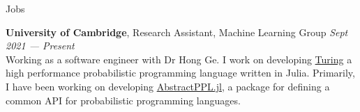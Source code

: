 \begin{rSection}{Jobs}

    {\bf University of Cambridge}, Research Assistant, Machine Learning Group  \hfill {\em Sept 2021 — Present} \\
    Working as a software engineer with Dr Hong Ge. I work on developing \href{https://github.com/TuringLang}{Turing}
    a high performance probabilistic programming language written in Julia. 
    Primarily, I have been working on developing \href{https://github.com/TuringLang/AbstractPPL.jl}{AbstractPPL.jl}, a package for 
    defining a common API for probabilistic programming languages.
\end{rSection}
    